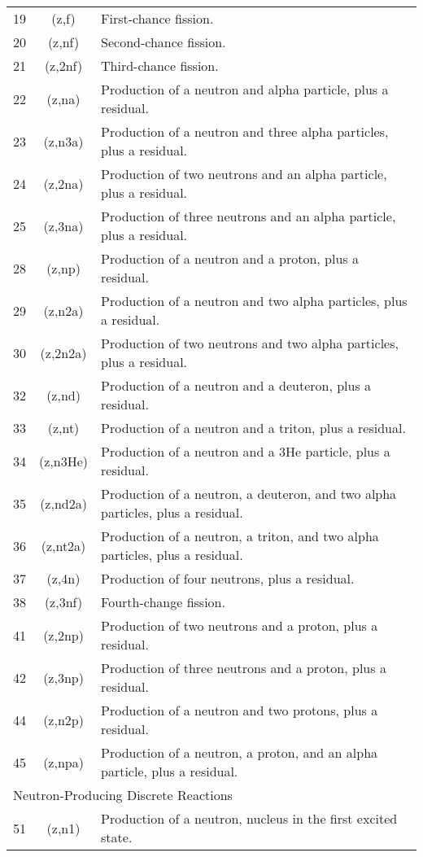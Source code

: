 \begin{table}[h]
\begin{tabular}{| l | c | l |}
19	& (z,f)	   &      First-chance fission.	\\
20	& (z,nf)	 &       Second-chance fission.	\\
21	& (z,2nf)	 &    Third-chance fission.	\\
22	& (z,na)	 &    Production of a neutron and alpha particle, plus a residual.	\\
23	& (z,n3a)	 &    Production of a neutron and three alpha particles, plus a residual.	\\
24	& (z,2na)	 &    Production of two neutrons and an alpha particle, plus a residual.	\\
25	& (z,3na)	 &    Production of three neutrons and an alpha particle, plus a residual.	\\
28	& (z,np)	 &    Production of a neutron and a proton, plus a residual.	\\
29	& (z,n2a)	 &    Production of a neutron and two alpha particles, plus a residual.	\\
30	& (z,2n2a)	&   Production of two neutrons and two alpha particles, plus a residual.	\\
32	& (z,nd)	 &    Production of a neutron and a deuteron, plus a residual.	\\
33	& (z,nt)	 &    Production of a neutron and a triton, plus a residual.	\\
34	& (z,n3He)	&   Production of a neutron and a 3He particle, plus a residual.	\\
35	& (z,nd2a)	&   Production of a neutron, a deuteron, and two alpha particles, plus a residual.	\\
36	& (z,nt2a)	&   Production of a neutron, a triton, and two alpha particles, plus a residual.	\\
37	& (z,4n)	 &    Production of four neutrons, plus a residual.	\\
38	& (z,3nf)	 &    Fourth-change fission.	\\
41	& (z,2np)	 &    Production of two neutrons and a proton, plus a residual.	\\
42	& (z,3np)	 &    Production of three neutrons and a proton, plus a residual.	\\
44	& (z,n2p)	 &    Production of a neutron and two protons, plus a residual.	\\
45	& (z,npa)	 &    Production of a neutron, a proton, and an alpha particle, plus a residual.	\\
\hline
\multicolumn{3}{l}{ Neutron-Producing Discrete Reactions} \\
\hline
51	& (z,n1)	& Production of a neutron, nucleus in the first excited state.	\\

\end{tabular}
\end{table}
